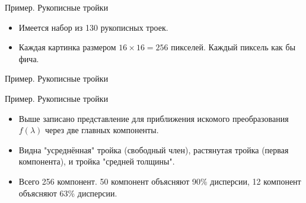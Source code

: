 \documentclass[9pt]{beamer}
\begin{document}

\begin{frame}{Пример. Рукописные тройки}
\begin{itemize}
    \item Имеется набор из 130 рукописных троек.
    \item Каждая картинка размером $16\times 16 = 256$ пикселей. Каждый пиксель как бы фича.
\end{itemize}
\end{frame}

\begin{frame}{Пример. Рукописные тройки}
\end{frame}

\begin{frame}{Пример. Рукописные тройки}
    \begin{itemize}
        \item Выше записано представление для приближения искомого преобразования $f(\lambda)$ через две главных компоненты.
        \item Видна "усреднённая" тройка (свободный член), растянутая тройка (первая компонента), и тройка "средней толщины".
        \item Всего 256 компонент. 50 компонент объясняют 90\% дисперсии, 12 компонент объясняют 63\% дисперсии.
    \end{itemize}
\end{frame}
\end{document}
